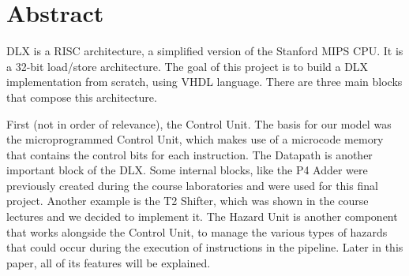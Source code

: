 %
% 
\chapter{Abstract}
\label{Abstract}


DLX is a RISC architecture, a simplified version of the Stanford MIPS CPU.
It is a 32-bit load/store architecture. The goal of this project is to build a DLX implementation
from scratch, using VHDL language. There are three main blocks that compose this architecture.

First (not in order of relevance), the Control Unit. The basis for our model was the microprogrammed Control Unit, which makes
use of a microcode memory that contains the control bits for each instruction.
The Datapath is another important block of the DLX. Some internal blocks, like the P4 Adder were previously created during the course laboratories
and were used for this final project. Another example is the T2 Shifter, which was shown in the course lectures and we decided to implement it.
The Hazard Unit is another component that works alongside the Control Unit, to manage the various types of hazards that could occur during the
execution of instructions in the pipeline. Later in this paper, all of its features will be explained.


